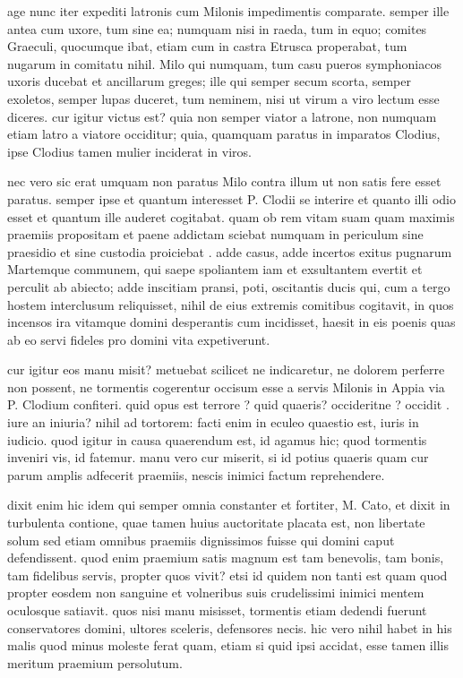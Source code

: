  age nunc iter expediti latronis cum Milonis impedimentis comparate. semper ille antea cum uxore, tum sine ea; numquam nisi in raeda, tum in equo; comites Graeculi, quocumque ibat, etiam cum in castra Etrusca properabat, tum nugarum in comitatu nihil. Milo qui numquam, tum casu pueros symphoniacos uxoris ducebat et ancillarum greges; ille qui semper secum scorta, semper exoletos, semper lupas duceret, tum neminem, nisi ut virum a viro lectum esse diceres. cur igitur victus est? quia non semper viator a latrone, non numquam etiam latro a viatore occiditur; quia, quamquam paratus in imparatos Clodius, ipse Clodius tamen mulier inciderat in viros.

 nec vero sic erat umquam non paratus Milo contra illum ut non satis fere esset paratus. semper ipse et quantum interesset P. Clodii se interire et quanto illi odio esset et quantum ille auderet cogitabat. quam ob rem vitam suam quam maximis praemiis propositam et paene addictam sciebat numquam in periculum sine praesidio et sine custodia proiciebat . adde casus, adde incertos exitus pugnarum Martemque communem, qui saepe spoliantem iam et exsultantem evertit et perculit ab abiecto; adde inscitiam pransi, poti, oscitantis ducis qui, cum a tergo hostem interclusum reliquisset, nihil de eius extremis comitibus cogitavit, in quos incensos ira vitamque domini desperantis cum incidisset, haesit in eis poenis quas ab eo servi fideles pro domini vita expetiverunt.

 cur igitur eos manu misit? metuebat scilicet ne indicaretur, ne dolorem perferre non possent, ne tormentis cogerentur occisum esse a servis Milonis in Appia via P. Clodium confiteri. quid opus est terrore ? quid quaeris? occideritne ? occidit . iure an iniuria? nihil ad tortorem: facti enim in eculeo quaestio est, iuris in iudicio. quod igitur in causa quaerendum est, id agamus hic; quod tormentis inveniri vis, id fatemur. manu vero cur miserit, si id potius quaeris quam cur parum amplis adfecerit praemiis, nescis inimici factum reprehendere.

 dixit enim hic idem qui semper omnia constanter et fortiter, M. Cato, et dixit in turbulenta contione, quae tamen huius auctoritate placata est, non libertate solum sed etiam omnibus praemiis dignissimos fuisse qui domini caput defendissent. quod enim praemium satis magnum est tam benevolis, tam bonis, tam fidelibus servis, propter quos vivit? etsi id quidem non tanti est quam quod propter eosdem non sanguine et volneribus suis crudelissimi inimici mentem oculosque satiavit. quos nisi manu misisset, tormentis etiam dedendi fuerunt conservatores domini, ultores sceleris, defensores necis. hic vero nihil habet in his malis quod minus moleste ferat quam, etiam si quid ipsi accidat, esse tamen illis meritum praemium persolutum.

